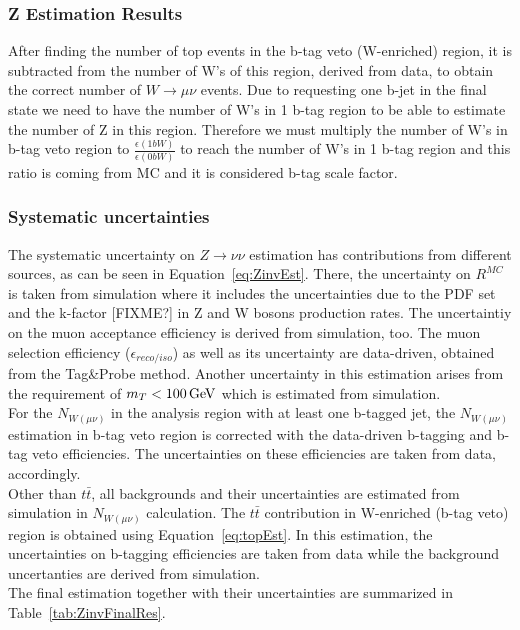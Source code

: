 \subsubsection{Z Estimation Results}
After finding the number of top events in the b-tag veto (W-enriched) region, it is subtracted from the number of W's of this region, derived from data, to obtain the correct number of $W\rightarrow\mu\nu$ events. Due to requesting one b-jet in the final state we need to have the number of W's in 1 b-tag region to be able to estimate the number of Z in this region. Therefore we must multiply the number of W's in b-tag veto region to $\frac{\epsilon(1b W)}{\epsilon(0b W)}$ to reach the number of W's in 1 b-tag region and this ratio is coming from MC and it is considered b-tag scale factor.   

\subsubsection{Systematic uncertainties}
\label{subsect:ZnnSyst}
The systematic uncertainty on $Z\to \nu\nu$ estimation has contributions from different sources, as can be seen in Equation~\ref{eq:ZinvEst}. There, the uncertainty on $R^{MC}$ is taken from simulation where it includes the uncertainties due to the PDF set and the k-factor [FIXME?] in Z and W bosons production rates. The uncertaintiy on the muon acceptance efficiency is derived from simulation, too. The muon selection efficiency ($\epsilon_{reco/iso}$) as well as its uncertainty are data-driven, obtained from the Tag\&Probe method. Another uncertainty in this estimation arises from the requirement of $m_T<100\,\rm GeV$ which is estimated from simulation.\\
For the $N_{W(\mu\nu)}$ in the analysis region with at least one b-tagged jet, the $N_{W(\mu\nu)}$ estimation in b-tag veto region is corrected with  the data-driven b-tagging and b-tag veto efficiencies. The uncertainties on these efficiencies are taken from data, accordingly.\\
Other than $t\bar{t}$, all backgrounds and their uncertainties are estimated from simulation in $N_{W(\mu\nu)}$ calculation. The $t\bar{t}$ contribution in W-enriched (b-tag veto) region is obtained using Equation~\ref{eq:topEst}. In this estimation, the uncertainties on b-tagging efficiencies are taken from data while the background uncertanties are derived from simulation. \\ 

The final estimation together with their uncertainties are summarized in Table~\ref{tab:ZinvFinalRes}.

